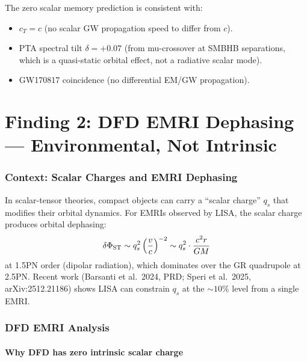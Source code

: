\documentclass[11pt]{article}
\begin{document}
The zero scalar memory prediction is consistent with:
\begin{itemize}[nosep]
\item $c_T = c$ (no scalar GW propagation speed to differ from $c$).
\item PTA spectral tilt $\delta = +0.07$ (from mu-crossover at SMBHB
  separations, which is a quasi-static orbital effect, not a
  radiative scalar mode).
\item GW170817 coincidence (no differential EM/GW propagation).
\end{itemize}


\part{Finding 2: DFD EMRI Dephasing --- Environmental, Not Intrinsic}
\label{part:EMRI}

\section{Context: Scalar Charges and EMRI Dephasing}

In scalar-tensor theories, compact objects can carry a ``scalar charge''
$q_s$ that modifies their orbital dynamics. For EMRIs observed by LISA,
the scalar charge produces orbital dephasing:
\begin{equation}
\delta\Phi_{\rm ST} \sim q_s^2 \left(\frac{v}{c}\right)^{-2}
\sim q_s^2 \cdot \frac{c^2 r}{G M}
\end{equation}
at 1.5PN order (dipolar radiation), which dominates over the GR
quadrupole at 2.5PN. Recent work (Barsanti et al.\ 2024, PRD;
Speri et al.\ 2025, arXiv:2512.21186) shows LISA can constrain
$q_s$ at the $\sim 10\%$ level from a single EMRI.

\section{DFD EMRI Analysis}

\subsection{Why DFD has zero intrinsic scalar charge}
\end{document}
